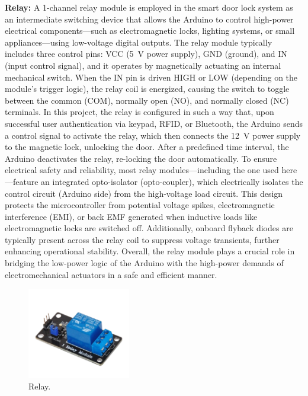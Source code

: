 \documentclass[conference, onecolumn]{IEEEtran}
\begin{document}
 \textbf{Relay:} A 1-channel relay module is employed in the smart door lock system as an intermediate switching device that allows the Arduino to control high-power electrical components—such as electromagnetic locks, lighting systems, or small appliances—using low-voltage digital outputs. The relay module typically includes three control pins: VCC (5~V power supply), GND (ground), and IN (input control signal), and it operates by magnetically actuating an internal mechanical switch. When the IN pin is driven HIGH or LOW (depending on the module's trigger logic), the relay coil is energized, causing the switch to toggle between the common (COM), normally open (NO), and normally closed (NC) terminals. In this project, the relay is configured in such a way that, upon successful user authentication via keypad, RFID, or Bluetooth, the Arduino sends a control signal to activate the relay, which then connects the 12~V power supply to the magnetic lock, unlocking the door. After a predefined time interval, the Arduino deactivates the relay, re-locking the door automatically. To ensure electrical safety and reliability, most relay modules—including the one used here—feature an integrated opto-isolator (opto-coupler), which electrically isolates the control circuit (Arduino side) from the high-voltage load circuit. This design protects the microcontroller from potential voltage spikes, electromagnetic interference (EMI), or back EMF generated when inductive loads like electromagnetic locks are switched off. Additionally, onboard flyback diodes are typically present across the relay coil to suppress voltage transients, further enhancing operational stability. Overall, the relay module plays a crucial role in bridging the low-power logic of the Arduino with the high-power demands of electromechanical actuators in a safe and efficient manner.

\begin{figure}[H]
	\centering
	\includegraphics[width=0.4\textwidth]{relay.pdf}
	\caption{Relay.}
	\label{fig7}
\end{figure}	
\end{document}
